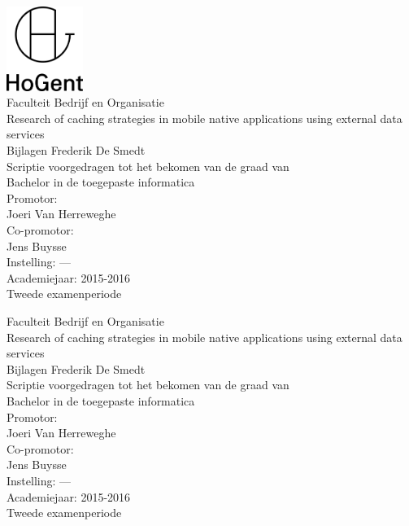 \documentclass[pdftex,a4paper,12pt,twoside]{report}
\newcommand{\emptypage}{
\newpage
\thispagestyle{empty}
\mbox{}
\newpage
}
\newcommand{\student}{Frederik De Smedt}
\newcommand{\promotor}{Joeri Van Herreweghe}
\newcommand{\copromotor}{Jens Buysse}
\newcommand{\instelling}{---}
\newcommand{\titel}{Research of caching strategies in mobile native applications using external data services}
\newcommand{\faculteit}{Faculteit Bedrijf en Organisatie}
\newcommand{\rapporttype}{Scriptie voorgedragen tot het bekomen van de graad van\\Bachelor in de toegepaste informatica}
\newcommand{\academiejaar}{2015-2016}
\newcommand{\examenperiode}{Tweede examenperiode}
\begin{document}

\begin{titlepage}
  \begin{center}

    \begingroup
    \rmfamily
    \includegraphics[width=2.5cm]{img/HG-beeldmerk-woordmerk}\\[.5cm]
    \faculteit\\[3cm]
    \titel\\[1cm]
    Bijlagen
    \vfill
    \student\\[3.5cm]
    \rapporttype\\[2cm]
    Promotor:\\
    \promotor\\
    Co-promotor:\\
    \copromotor\\[2.5cm]
    Instelling: \instelling\\[.5cm]
    Academiejaar: \academiejaar\\[.5cm]
    \examenperiode
    \endgroup

  \end{center}
  \restoregeometry
\end{titlepage}


\emptypage


\begin{titlepage}
  \begin{center}

    \begingroup
    \rmfamily
    \faculteit\\[3cm]
    \titel\\[1cm]
    Bijlagen
    \vfill
    \student\\[3.5cm]
    \rapporttype\\[2cm]
    Promotor:\\
    \promotor\\
    Co-promotor:\\
    \copromotor\\[2.5cm]
    Instelling: \instelling\\[.5cm]
    Academiejaar: \academiejaar\\[.5cm]
    \examenperiode
    \endgroup

  \end{center}
  \restoregeometry
\end{titlepage}
\end{document}
